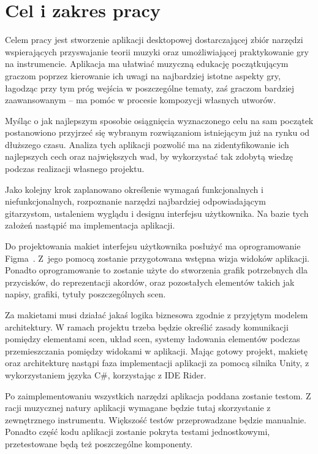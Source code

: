 \section{Cel i zakres pracy}
Celem pracy jest stworzenie aplikacji desktopowej dostarczającej zbiór narzędzi wspierających przyswajanie teorii muzyki oraz umożliwiającej praktykowanie gry na instrumencie. Aplikacja ma ułatwiać muzyczną edukację początkującym graczom poprzez kierowanie ich uwagi na najbardziej istotne aspekty gry, łagodząc przy tym próg wejścia w poszczególne tematy, zaś graczom bardziej zaawansowanym -- ma pomóc w procesie kompozycji własnych utworów. 

Myśląc o jak najlepszym sposobie osiągnięcia wyznaczonego celu na sam początek postanowiono przyjrzeć się wybranym rozwiązaniom istniejącym już na rynku od dłuższego czasu. Analiza tych aplikacji pozwolić ma na zidentyfikowanie ich najlepszych cech oraz największych wad, by wykorzystać tak zdobytą wiedzę podczas realizacji własnego projektu. 

Jako kolejny krok zaplanowano określenie wymagań funkcjonalnych i niefunkcjonalnych, rozpoznanie narzędzi najbardziej odpowiadającym gitarzystom, ustaleniem wyglądu i designu interfejsu użytkownika. Na bazie tych założeń nastąpić ma implementacja aplikacji.

Do projektowania makiet interfejsu użytkownika posłużyć ma oprogramowanie Figma~\cite{Figma}. Z~jego pomocą zostanie przygotowana wstępna wizja widoków aplikacji. Ponadto oprogramowanie to zostanie użyte do stworzenia grafik potrzebnych dla przycisków, do reprezentacji akordów, oraz pozostałych elementów takich jak napisy, grafiki, tytuły poszczególnych scen. 

Za makietami musi działać jakaś logika biznesowa zgodnie z przyjętym modelem architektury. W ramach projektu trzeba będzie określić zasady komunikacji pomiędzy elementami scen, układ scen, systemy ładowania elementów podczas przemieszczania pomiędzy widokami w aplikacji. Mając gotowy projekt, makietę oraz architekturę nastąpi faza implementacji aplikacji za pomocą silnika Unity, z wykorzystaniem języka C\#, korzystając z IDE Rider.

Po zaimplementowaniu wszystkich narzędzi aplikacja poddana zostanie testom. Z racji muzycznej natury aplikacji wymagane będzie tutaj skorzystanie z zewnętrznego instrumentu. Większość testów przeprowadzane będzie manualnie. Ponadto część kodu aplikacji zostanie pokryta testami jednostkowymi, przetestowane będą też poszczególne komponenty. 

